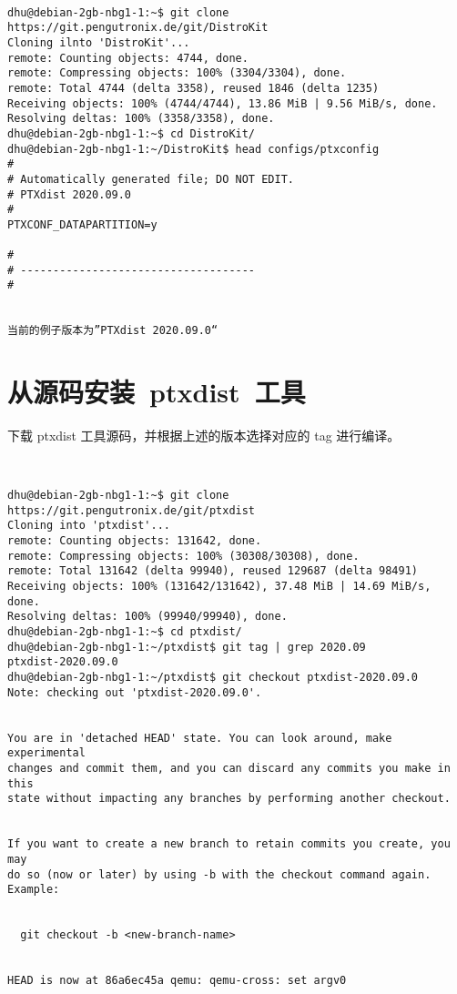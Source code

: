 \begin{lstlisting}

dhu@debian-2gb-nbg1-1:~$ git clone https://git.pengutronix.de/git/DistroKit  
Cloning ilnto 'DistroKit'...                                                  
remote: Counting objects: 4744, done.
remote: Compressing objects: 100% (3304/3304), done.                         
remote: Total 4744 (delta 3358), reused 1846 (delta 1235)                    
Receiving objects: 100% (4744/4744), 13.86 MiB | 9.56 MiB/s, done.           
Resolving deltas: 100% (3358/3358), done.                                    
dhu@debian-2gb-nbg1-1:~$ cd DistroKit/
dhu@debian-2gb-nbg1-1:~/DistroKit$ head configs/ptxconfig                    
#
# Automatically generated file; DO NOT EDIT.                                 
# PTXdist 2020.09.0                                                          
#                                                                            
PTXCONF_DATAPARTITION=y                                                      
                                                                             
#
# ------------------------------------
#


当前的例子版本为”PTXdist 2020.09.0“

\end{lstlisting}

\section{从源码安装~ptxdist~工具}
下载 ptxdist 工具源码，并根据上述的版本选择对应的 tag 进行编译。

\begin{lstlisting}
  

dhu@debian-2gb-nbg1-1:~$ git clone https://git.pengutronix.de/git/ptxdist
Cloning into 'ptxdist'...
remote: Counting objects: 131642, done.
remote: Compressing objects: 100% (30308/30308), done.
remote: Total 131642 (delta 99940), reused 129687 (delta 98491)
Receiving objects: 100% (131642/131642), 37.48 MiB | 14.69 MiB/s, done.
Resolving deltas: 100% (99940/99940), done.
dhu@debian-2gb-nbg1-1:~$ cd ptxdist/
dhu@debian-2gb-nbg1-1:~/ptxdist$ git tag | grep 2020.09
ptxdist-2020.09.0
dhu@debian-2gb-nbg1-1:~/ptxdist$ git checkout ptxdist-2020.09.0
Note: checking out 'ptxdist-2020.09.0'.


You are in 'detached HEAD' state. You can look around, make experimental
changes and commit them, and you can discard any commits you make in this
state without impacting any branches by performing another checkout.


If you want to create a new branch to retain commits you create, you may
do so (now or later) by using -b with the checkout command again. Example:


  git checkout -b <new-branch-name>


HEAD is now at 86a6ec45a qemu: qemu-cross: set argv0

\end{lstlisting}


